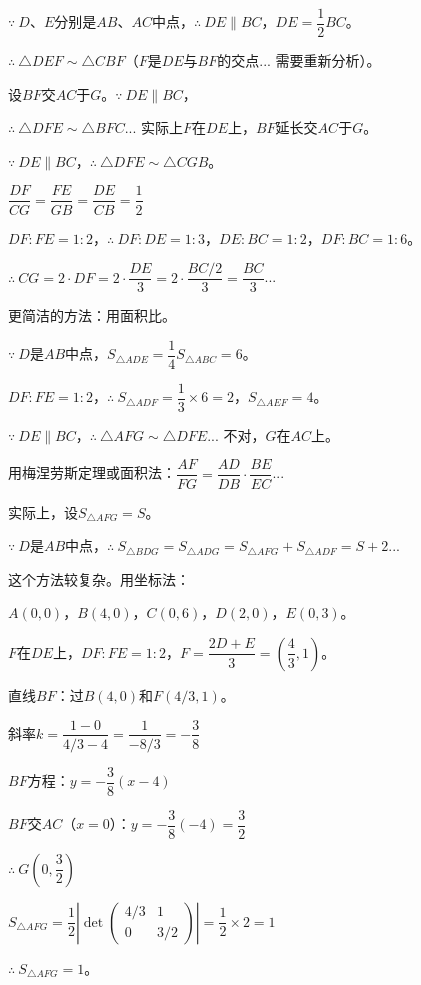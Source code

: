 \documentclass[12pt, a4paper]{ctexart}
\begin{document}
\begin{proofbox}[【题7】详解]
$\because\ D$、$E$分别是$AB$、$AC$中点，$\therefore\ DE \parallel BC$，$DE = \dfrac{1}{2}BC$。

$\therefore\ \triangle DEF \sim \triangle CBF$（$F$是$DE$与$BF$的交点... 需要重新分析）。

设$BF$交$AC$于$G$。$\because\ DE \parallel BC$，

$\therefore\ \triangle DFE \sim \triangle BFC$... 实际上$F$在$DE$上，$BF$延长交$AC$于$G$。

$\because\ DE \parallel BC$，$\therefore\ \triangle DFE \sim \triangle CGB$。

$\dfrac{DF}{CG} = \dfrac{FE}{GB} = \dfrac{DE}{CB} = \dfrac{1}{2}$

$DF:FE = 1:2$，$\therefore\ DF:DE = 1:3$，$DE:BC = 1:2$，$DF:BC = 1:6$。

$\therefore\ CG = 2 \cdot DF = 2 \cdot \dfrac{DE}{3} = 2 \cdot \dfrac{BC/2}{3} = \dfrac{BC}{3}$...

更简洁的方法：用面积比。

$\because\ D$是$AB$中点，$S_{\triangle ADE} = \dfrac{1}{4} S_{\triangle ABC} = 6$。

$DF:FE = 1:2$，$\therefore\ S_{\triangle ADF} = \dfrac{1}{3} \times 6 = 2$，$S_{\triangle AEF} = 4$。

$\because\ DE \parallel BC$，$\therefore\ \triangle AFG \sim \triangle DFE$... 不对，$G$在$AC$上。

用梅涅劳斯定理或面积法：$\dfrac{AF}{FG} = \dfrac{AD}{DB} \cdot \dfrac{BE}{EC}$...

实际上，设$S_{\triangle AFG} = S$。

$\because\ D$是$AB$中点，$\therefore\ S_{\triangle BDG} = S_{\triangle ADG} = S_{\triangle AFG} + S_{\triangle ADF} = S + 2$...

这个方法较复杂。用坐标法：

$A(0,0)$，$B(4,0)$，$C(0,6)$，$D(2,0)$，$E(0,3)$。

$F$在$DE$上，$DF:FE = 1:2$，$F = \dfrac{2D + E}{3} = \left(\dfrac{4}{3}, 1\right)$。

直线$BF$：过$B(4,0)$和$F(4/3, 1)$。

斜率$k = \dfrac{1-0}{4/3-4} = \dfrac{1}{-8/3} = -\dfrac{3}{8}$

$BF$方程：$y = -\dfrac{3}{8}(x-4)$

$BF$交$AC$（$x=0$）：$y = -\dfrac{3}{8}(-4) = \dfrac{3}{2}$

$\therefore\ G\left(0, \dfrac{3}{2}\right)$

$S_{\triangle AFG} = \dfrac{1}{2} \left| \det \begin{pmatrix} 4/3 & 1 \\ 0 & 3/2 \end{pmatrix} \right| = \dfrac{1}{2} \times 2 = 1$

$\therefore\ S_{\triangle AFG} = \boxed{1}$。
\end{proofbox}
\end{document}
